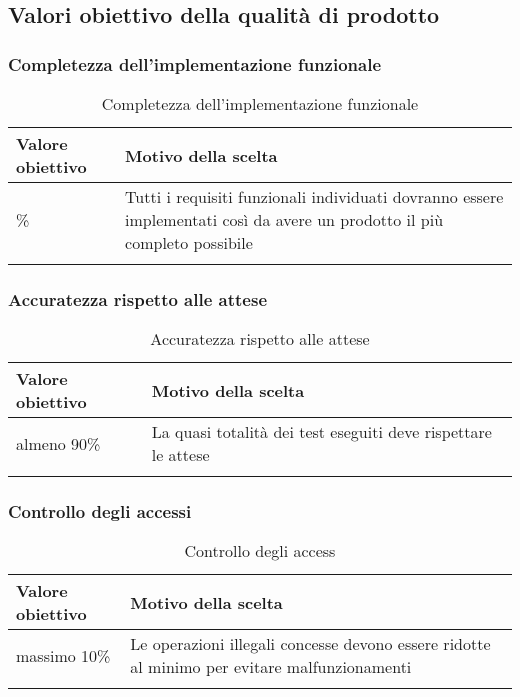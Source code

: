 \documentclass[../PianoDiQualifica.tex]{subfiles}
\begin{document}
	\subsection{Valori obiettivo della qualità di prodotto}
		\subsubsection{Completezza dell'implementazione funzionale}
			\begin{longtable}[c] { >{\centering\arraybackslash}p{4cm} p{7cm} }
				\toprule
				\centerline{\textbf{Valore obiettivo}} & \centerline{\textbf{Motivo della scelta}} \\
				\midrule
					100\% &	Tutti i requisiti funzionali individuati dovranno essere implementati così da avere un prodotto il più completo possibile\\
				\bottomrule
				\caption{Completezza dell'implementazione funzionale}
			\end{longtable}
			
		\subsubsection{Accuratezza rispetto alle attese}
			\begin{longtable}[c] { >{\centering\arraybackslash}p{4cm} p{7cm} }
				\toprule
				\centerline{\textbf{Valore obiettivo}} & \centerline{\textbf{Motivo della scelta}} \\
				\midrule
					almeno 90\% & La quasi totalità dei test eseguiti deve rispettare le attese \\
				\bottomrule
				\caption{Accuratezza rispetto alle attese}
			\end{longtable}
			
		\subsubsection{Controllo degli accessi}
			\begin{longtable}[c] { >{\centering\arraybackslash}p{4cm} p{7cm} }
				\toprule
				\centerline{\textbf{Valore obiettivo}} & \centerline{\textbf{Motivo della scelta}} \\
				\midrule
					massimo 10\% & Le operazioni illegali concesse devono essere ridotte al minimo per evitare malfunzionamenti \\
				\bottomrule
				\caption{Controllo degli access}
			\end{longtable}
			
\end{document}
